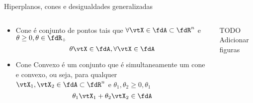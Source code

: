 \begin{frame}{Hiperplanos, cones e desigualdades generalizadas}
  \begin{columns}
    \begin{column}{0.48\linewidth}
      \begin{itemize}
        \item Cone é conjunto de pontos tais que $ \forall \vtX \in \fdA \subset \fdR^n$ e $ \theta \geq 0, \theta \in \fdR_{+}$
        \begin{equation}\label{eq_cone}
          \theta \vtX \in \fdA, \forall \vtX \in \fdA
        \end{equation}
       
        \item Cone Convexo é um conjunto que é simultaneamente um cone e convexo, ou seja, para qualquer $\vtX_{1}, \vtX_{2} \in \fdA \subset \fdR^n$ e $ \theta_{1}, \theta_{2} \geq 0, \theta_1$
        \begin{equation}\label{eq_cone_conv}
          \theta_{1} \vtX_{1} + \theta_{2} \vtX_{2} \in \fdA
        \end{equation}
      \end{itemize}
    \end{column}

    \hfill

    \begin{column}{0.48\linewidth}
      \begin{block}{TODO}
        Adicionar figuras
      \end{block}
    \end{column}
  \end{columns}
\end{frame}

